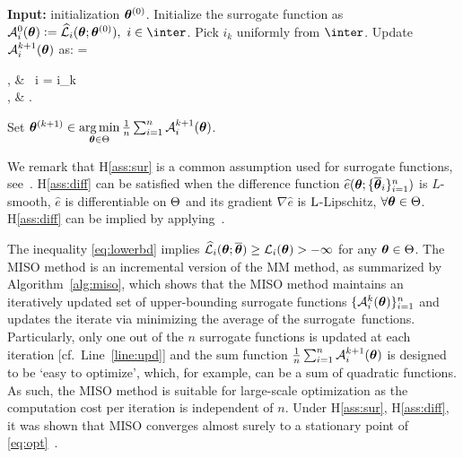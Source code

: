 \documentclass{article}
\begin{document}
\begin{algorithm}[H]
\begin{algorithmic}[1]
\STATE \textbf{Input:} initialization $\hp{0}$.
\STATE Initialize the surrogate function as\\
$\tafctdet{i}{0}{ \param } \eqdef \sur{i}{\param}{\hp{0}},~i \in \inter$.
\STATE Pick $i_k$ uniformly from $\inter$.
\STATE Update $\tafctdet{i}{k+1}{\param}$ as: \label{line:upd}
\beq \notag
{} = \begin{cases}
, & ~i = i_k \\
, & .
\end{cases}
\eeq
\STATE  Set $\hp{k+1} \in \argmin \limits_{ \param \in \Param }  \frac{1}{n} \sum_{i=1}^n \tafctdet{i}{k+1}{\param}$.\label{miso:iter}
\ENDFOR
\end{algorithmic}
\caption{The MISO method.}
\label{alg:miso}
        \end{algorithm}

We remark that H\ref{ass:sur} is a common assumption used for surrogate functions, see~\cite[Section 2.3]{mairal2015miso}.
H\ref{ass:diff} can be satisfied when the difference function $\widehat{e}(\param ; \{ \op_i \}_{i=1}^n )$ is $L$-smooth, \ie $\widehat{e}$ is differentiable on $\Param$ and its gradient $\nabla \widehat{e}$ is $\rm L$-Lipschitz,  $\forall\param \in \Theta$. 
H\ref{ass:diff} can be implied by applying~\cite[Proposition 1]{razaviyayn2013unified}.

The inequality \eqref{eq:lowerbd} implies $\sur{i}{\param}{\op} \geq {\cal L}_i ( \param ) > - \infty$ for any $\param \in \Param$.
The MISO method is an incremental version of the MM method, as summarized by Algorithm~\ref{alg:miso}, which shows that the MISO method maintains an iteratively updated set of upper-bounding surrogate functions $\{ \tafctdet{i}{k}{\param} \}_{i=1}^n$ and updates the iterate via minimizing the average of the surrogate~functions.
Particularly, only one out of the $n$ surrogate functions is updated at each iteration [cf.~Line~\ref{line:upd}] and the sum function $\frac{1}{n} \sum_{i=1}^n \tafctdet{i}{k+1}{\param}$ is designed to be `easy to optimize', which, for example,  can be a sum of quadratic functions. As such, the MISO method is suitable for large-scale optimization as the computation cost per iteration is independent of $n$.
Under H\ref{ass:sur}, H\ref{ass:diff}, it was shown that MISO converges almost surely to a stationary point of \eqref{eq:opt}~\cite[Prop. 3.1]{mairal2015miso}.
\end{document}
